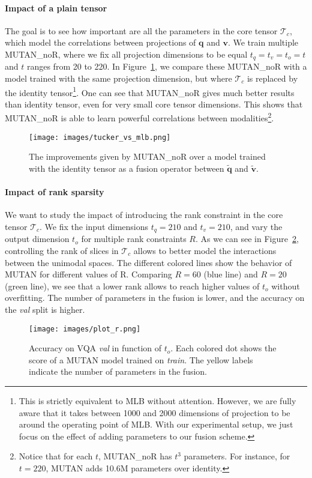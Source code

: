 \documentclass[10pt,twocolumn,letterpaper]{article}
\newcommand{\tens}[1]{
\bm{\mathcal{#1}}
}
\newcommand{\q}{\mathbf{q}}
\newcommand{\vv}{\mathbf{v}}
\newcommand{\tq}{\mathbf{\tilde{q}}}
\newcommand{\tv}{\mathbf{\tilde{v}}}
\begin{document}
\paragraph{Impact of a plain tensor}
The goal is to see how important are all the parameters in the core tensor $\tens{T}_c$, which  model the correlations between projections of $\q$ and $\vv$. We train multiple MUTAN\_noR, where we fix all projection dimensions to be equal $t_q = t_v = t_o = t$ and $t$ ranges from 20 to 220. In Figure~\ref{tucker_vs_mlb}, we compare these MUTAN\_noR with a model trained with the same projection dimension, but where $\tens{T}_c$ is replaced by the 
identity tensor\footnote{This is strictly equivalent to MLB \cite{Kim2017} without attention. However, we are fully aware that it takes between 1000 and 2000 dimensions of projection to be around the operating point of MLB. With our experimental setup, we just focus on the effect of adding parameters to our fusion scheme.}. One can see that MUTAN\_noR gives much better results than identity tensor, even for very small core tensor dimensions. This shows that MUTAN\_noR is able to learn powerful correlations between modalities\footnote{Notice that for each $t$, MUTAN\_noR has $t^3$ parameters. For instance, for $t=220$, MUTAN adds 10.6M parameters over identity.}.
\begin{figure}
\texttt{[image: images/tucker\_vs\_mlb.png]}
\caption{\label{tucker_vs_mlb} The improvements given by MUTAN\_noR over a model trained with the identity tensor as a fusion operator between $\tq$ and $\tv$.}
\end{figure}
\vspace{-0.3cm}
\paragraph{Impact of rank sparsity}
We want to study the impact of introducing the rank constraint in the core tensor $\tens{T}_c$. We fix the input dimensions $t_q = 210$ and $t_v = 210$, and vary the output dimension $t_o$ for multiple rank constraints $R$. As we can see in Figure~\ref{plot:r}, controlling the rank of slices in $\tens{T}_c$ allows to better model the interactions between the unimodal spaces. The different colored lines show the behavior of MUTAN for different values of R. Comparing $R=60$ (blue line) and $R=20$ (green line), we see that a lower rank allows to reach higher values of $t_o$ without overfitting. The number of parameters in the fusion is lower, and the accuracy on the \textit{val} split is higher. 
\begin{figure}
 \texttt{[image: images/plot\_r.png]}
\caption{\label{plot:r} Accuracy on VQA \textit{val} in function of $t_o$. Each colored dot shows the score of a MUTAN model trained on \textit{train}. The yellow labels indicate the number of parameters in the fusion.}
\end{figure}
\vspace{-0.3cm}
\end{document}
